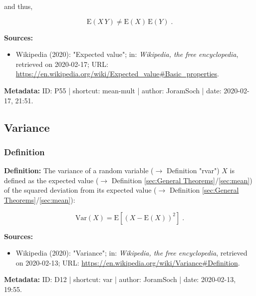 \documentclass[a4paper,12pt]{book}
\begin{document}
and thus,

\begin{equation} \label{eq:mean-mult-mean-nonmult-qed}
\mathrm{E}(X\,Y) \neq \mathrm{E}(X) \, \mathrm{E}(Y) \; .
\end{equation}

\vspace{1em}
\textbf{Sources:}
\begin{itemize}
\item Wikipedia (2020): "Expected value"; in: \textit{Wikipedia, the free encyclopedia}, retrieved on 2020-02-17; URL: \url{https://en.wikipedia.org/wiki/Expected_value#Basic_properties}.
\end{itemize}


\vspace{1em}
\textbf{Metadata:} ID: P55 | shortcut: mean-mult | author: JoramSoch | date: 2020-02-17, 21:51.


\subsection{Variance}

\subsubsection[\textit{Definition}]{Definition} \label{sec:var}

\vspace{1em}
\textbf{Definition:} The variance of a random variable ($\rightarrow$ Definition "rvar") $X$ is defined as the expected value ($\rightarrow$ Definition \ref{sec:General Theorems}/\ref{sec:mean}) of the squared deviation from its expected value ($\rightarrow$ Definition \ref{sec:General Theorems}/\ref{sec:mean}):

\begin{equation} \label{eq:var-var}
\mathrm{Var}(X) = \mathrm{E}\left[ (X-\mathrm{E}(X))^2 \right] \; .
\end{equation}

\vspace{1em}
\textbf{Sources:}
\begin{itemize}
\item Wikipedia (2020): "Variance"; in: \textit{Wikipedia, the free encyclopedia}, retrieved on 2020-02-13; URL: \url{https://en.wikipedia.org/wiki/Variance#Definition}.
\end{itemize}


\vspace{1em}
\textbf{Metadata:} ID: D12 | shortcut: var | author: JoramSoch | date: 2020-02-13, 19:55.
\end{document}
